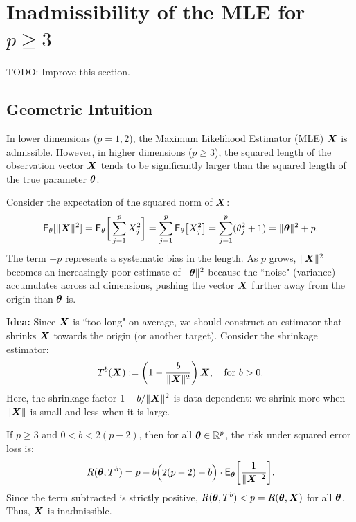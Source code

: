 \section{Inadmissibility of the MLE for \texorpdfstring{$p \ge 3$}{p >= 3}}

TODO: Improve this section.

\subsection{Geometric Intuition}

In lower dimensions ($p=1, 2$), the Maximum Likelihood Estimator (MLE) $\boldsymbol{X}$ is admissible. However, in higher dimensions ($p \ge 3$), the squared length of the observation vector $\boldsymbol{X}$ tends to be significantly larger than the squared length of the true parameter $\boldsymbol{\theta}$.

Consider the expectation of the squared norm of $\boldsymbol{X}$:
\[
\mathsf{E}_{\theta}[\|\boldsymbol{X}\|^2] = \mathsf{E}_{\theta}\bigg[\sum_{j=1}^p X_j^2\bigg] = \sum_{j=1}^p \mathsf{E}_{\theta}\big[X_j^2\big] = \sum_{j=1}^p (\theta_j^2 + 1) = \|\boldsymbol{\theta}\|^2 + p.
\]
The term $+p$ represents a systematic bias in the length. As $p$ grows, $\|\boldsymbol{X}\|^2$ becomes an increasingly poor estimate of $\|\boldsymbol{\theta}\|^2$ because the ``noise" (variance) accumulates across all dimensions, pushing the vector $\boldsymbol{X}$ further away from the origin than $\boldsymbol{\theta}$ is.



\textbf{Idea:} Since $\boldsymbol{X}$ is ``too long" on average, we should construct an estimator that shrinks $\boldsymbol{X}$ towards the origin (or another target). Consider the shrinkage estimator:
\[
T^b(\boldsymbol{X}) := \left(1 - \frac{b}{\|\boldsymbol{X}\|^2}\right) \boldsymbol{X}, \quad \text{for } b > 0.
\]
Here, the shrinkage factor $1 - b/\|\boldsymbol{X}\|^2$ is data-dependent: we shrink more when $\|\boldsymbol{X}\|$ is small and less when it is large.


\begin{theo}
\label{thm:james_stein}
If \(p \ge 3\) and \(0 < b < 2(p-2)\), then for all \(\boldsymbol{\theta} \in \mathbb{R}^p\), the risk under squared error loss is:
\[
R(\boldsymbol{\theta}, T^b) = p - b\Big(2(p-2) - b\Big) \cdot \mathsf{E}_{\boldsymbol{\theta}}\bigg[\frac{1}{\|\boldsymbol{X}\|^2}\bigg].
\]
Since the term subtracted is strictly positive, $R(\boldsymbol{\theta}, T^b) < p = R(\boldsymbol{\theta}, \boldsymbol{X})$ for all $\boldsymbol{\theta}$. Thus, $\boldsymbol{X}$ is inadmissible.
\end{theo}



